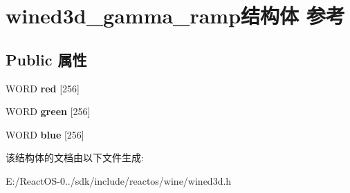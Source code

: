 \hypertarget{structwined3d__gamma__ramp}{}\section{wined3d\+\_\+gamma\+\_\+ramp结构体 参考}
\label{structwined3d__gamma__ramp}
\subsection*{Public 属性}
\begin{DoxyCompactItemize}
\item 
\mbox{\label{structwined3d__gamma__ramp_abc7dc64bffcad68d065869a248ba48fb}} 
W\+O\+RD {\bfseries red} \mbox{[}256\mbox{]}
\item 
\mbox{\label{structwined3d__gamma__ramp_a4c088334a47b1a0eb4e92007af4c97df}} 
W\+O\+RD {\bfseries green} \mbox{[}256\mbox{]}
\item 
\mbox{\label{structwined3d__gamma__ramp_a4cff3a17becea0d2ed80a88ddf3db141}} 
W\+O\+RD {\bfseries blue} \mbox{[}256\mbox{]}
\end{DoxyCompactItemize}


该结构体的文档由以下文件生成\+:\begin{DoxyCompactItemize}
\item 
E\+:/\+React\+O\+S-\/0../sdk/include/reactos/wine/wined3d.\+h\end{DoxyCompactItemize}
